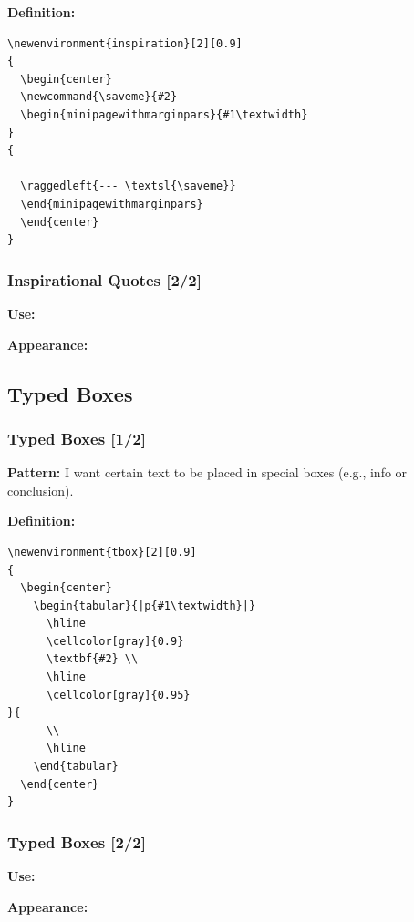 {\begin{frame}[fragile]
  \vspace{5mm}
  \textbf{Definition:}
  \begin{verbatim}
\newenvironment{inspiration}[2][0.9]
{
  \begin{center}
  \newcommand{\saveme}{#2}
  \begin{minipagewithmarginpars}{#1\textwidth}
}
{
  
  \raggedleft{--- \textsl{\saveme}}
  \end{minipagewithmarginpars}
  \end{center}
}
  \end{verbatim}
\end{frame}
\begin{frame}[fragile]
  \frametitle{Inspirational Quotes [2/2]}
  \vspace{3mm}
  \textbf{Use:}
  
  \vspace{5mm}
  \textbf{Appearance:}
\end{frame}

\subsection{Typed Boxes}
\begin{frame}[fragile]
  \frametitle{Typed Boxes [1/2]}
  \vspace{3mm}
  \textbf{Pattern:} I want certain text to be placed in special boxes (e.g., info or conclusion).
  
  \vspace{5mm}
  \textbf{Definition:}
  \begin{verbatim}
\newenvironment{tbox}[2][0.9]
{
  \begin{center}
    \begin{tabular}{|p{#1\textwidth}|}
      \hline
      \cellcolor[gray]{0.9}
      \textbf{#2} \\
      \hline
      \cellcolor[gray]{0.95}
}{
      \\
      \hline
    \end{tabular}
  \end{center}
}
  \end{verbatim}
\end{frame}
\begin{frame}[fragile]
  \frametitle{Typed Boxes [2/2]}
  \vspace{3mm}
  \textbf{Use:}
  
  \vspace{5mm}
  \textbf{Appearance:}
\end{frame}

}

